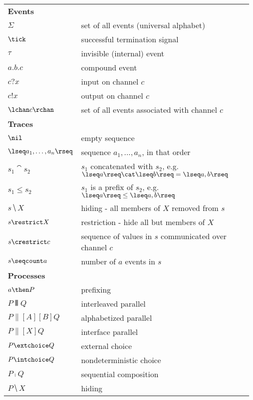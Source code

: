%
%
%
%
%

\begin{notation}

\setlength{\tabcolsep}{3mm}
{\begin {tabular}{ll}
\multicolumn{2}{l}{\textbf{Events}}\\
$\Sigma$ & set of all events (universal alphabet)\\
$\tick$   & successful termination signal\\
$\tau$ & invisible (internal) event\\
$a.b.c$    & compound event\\
$c ? x$   &input on channel $c$\\
$c ! x$   &output on channel $c$\\
$\lchan c \rchan$   &set of all events associated with channel $c$\\
\multicolumn{2}{l}{\textbf{Traces}}\\
$\nil$ &empty sequence\\
$\lseq a_1, \ldots , a_n \rseq$ & sequence $a_1, \ldots , a_n$, in that order\\
$s_1 \cat s_2$ &$s_1$ concatenated with $s_2$, e.g. $\lseq a \rseq \cat \lseq b \rseq = \lseq a, b \rseq$\\
$s_1 \leq s_2$ &$s_1$ is a prefix of $s_2$, e.g.  $\lseq a \rseq \leq \lseq a, b \rseq$ \\
$s \hide X$ &hiding - all members of $X$ removed from $s$\\
$s \restrict X$ &restriction - hide all but members of $X$\\
$s \crestrict c$ &sequence of values in $s$ communicated over channel $c$\\
$s \seqcount a$ &number of $a$ events in $s$\\
\multicolumn{2}{l}{\textbf{Processes}}\\
$a \then P$ &prefixing\\
$P \interleave Q$ &interleaved parallel\\
$P \parallel[A][B] Q$ &alphabetized parallel\\
$P \parallel[X] Q$ &interface parallel\\
$P \extchoice Q$ &external choice\\
$P \intchoice Q$ &nondeterministic choice\\
$P \comp Q$ &sequential composition\\
$P \hide X$ &hiding\\
\end {tabular}}


\end{notation}

